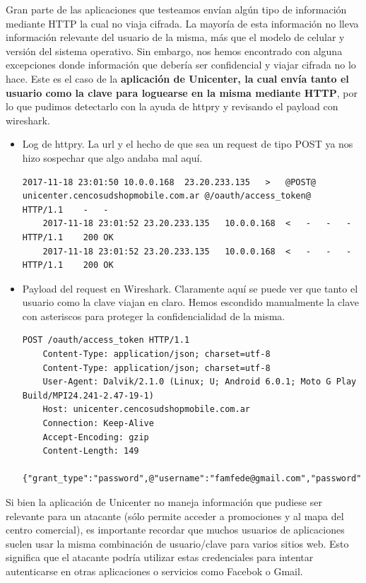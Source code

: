 Gran parte de las aplicaciones que testeamos envían algún tipo de información mediante HTTP la cual no viaja cifrada. La mayoría de esta 
información no lleva información relevante del usuario de la misma, más que el modelo de celular y versión del sistema operativo. Sin embargo, 
nos hemos encontrado con alguna excepciones donde información que debería ser confidencial y viajar cifrada no lo hace. Este es el caso de la 
\textbf{aplicación de Unicenter, la cual envía tanto el usuario como la clave para loguearse en la misma mediante HTTP}, por lo que pudimos 
detectarlo con la ayuda de httpry y revisando el payload con wireshark. 

\begin{itemize}
  
  \item Log de httpry. La url y el hecho de que sea un request de tipo POST ya nos hizo sospechar que algo andaba mal aquí.
  
  \begin{lstlisting}[style=base]
    2017-11-18 23:01:50	10.0.0.168	23.20.233.135	>	@POST@	unicenter.cencosudshopmobile.com.ar	@/oauth/access_token@	HTTP/1.1	-	-
    2017-11-18 23:01:52	23.20.233.135	10.0.0.168	<	-	-	-	HTTP/1.1	200	OK
    2017-11-18 23:01:52	23.20.233.135	10.0.0.168	<	-	-	-	HTTP/1.1	200	OK
  \end{lstlisting}
  
  \item Payload del request en Wireshark. Claramente aquí se puede ver que tanto el usuario como la clave viajan en claro. Hemos escondido manualmente la clave con asteriscos para proteger la confidencialidad de la misma.
  
  \begin{lstlisting}[style=base]
    POST /oauth/access_token HTTP/1.1
    Content-Type: application/json; charset=utf-8
    Content-Type: application/json; charset=utf-8
    User-Agent: Dalvik/2.1.0 (Linux; U; Android 6.0.1; Moto G Play Build/MPI24.241-2.47-19-1)
    Host: unicenter.cencosudshopmobile.com.ar
    Connection: Keep-Alive
    Accept-Encoding: gzip
    Content-Length: 149
    {"grant_type":"password",@"username":"famfede@gmail.com","password":"********"@,"client_id":"android","client_secret":"OX011HNR3Lpt870JAl1Rb8MM88BE27j8"}
  \end{lstlisting}
  
\end{itemize}

Si bien la aplicación de Unicenter no maneja información que pudiese ser relevante para un atacante (sólo permite acceder a promociones y al 
mapa del centro comercial), es importante recordar que muchos usuarios de aplicaciones suelen usar la misma combinación de usuario/clave para 
varios sitios web. Esto significa que el atacante podría utilizar estas credenciales para intentar autenticarse en otras aplicaciones o servicios
como Facebok o Gmail.

